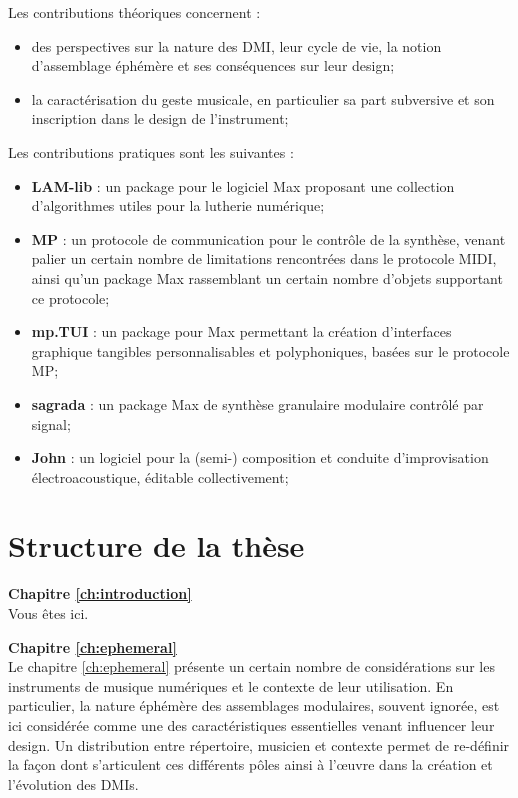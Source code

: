 Les contributions théoriques concernent :
\vspace{-1em}
\begin{itemize}[noitemsep]
\item des perspectives sur la nature des \gls{DMI}, leur cycle de vie, la notion d'assemblage éphémère et ses conséquences sur leur design;
\item la caractérisation du geste musicale, en particulier sa part subversive et son inscription dans le design de l'instrument;
\end{itemize}

Les contributions pratiques sont les suivantes :
\vspace{-1em}
\begin{itemize}[noitemsep]
\item \textbf{LAM-lib} : un package pour le logiciel Max proposant une collection d'algorithmes utiles pour la lutherie numérique;
\item \textbf{MP} : un protocole de communication pour le contrôle de la synthèse, venant palier un certain nombre de limitations rencontrées dans le protocole MIDI, ainsi qu'un package Max rassemblant un certain nombre d'objets supportant ce protocole;
\item \textbf{mp.TUI} : un package pour Max permettant la création d'interfaces graphique tangibles personnalisables et polyphoniques, basées sur le protocole MP;
\item \textbf{sagrada} : un package Max de synthèse granulaire modulaire contrôlé par signal;
\item \textbf{John} : un logiciel pour la (semi-) composition et conduite d'improvisation électroacoustique, éditable collectivement;
\end{itemize}


\section{Structure de la thèse}
\label{sec:preamble:structure}

\textbf{Chapitre \ref{ch:introduction}} \\[0.2em]
Vous êtes ici.

\textbf{Chapitre \ref{ch:ephemeral}} \\[0.2em]
Le chapitre \ref{ch:ephemeral} présente un certain nombre de considérations sur les instruments de musique numériques et le contexte de leur utilisation. En particulier, la nature éphémère des assemblages modulaires, souvent ignorée, est ici considérée comme une des caractéristiques essentielles venant influencer leur design. Un distribution entre répertoire, musicien et contexte permet de re-définir la façon dont s'articulent ces différents pôles ainsi à l'œuvre dans la création et l'évolution des DMIs.

